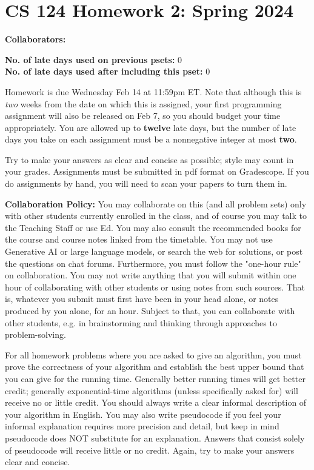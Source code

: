 \documentclass[11pt]{article}
\begin{document}


        \section*{CS 124 Homework 2: Spring 2024}


        \textbf{Collaborators: }

        \textbf{No. of late days used on previous psets:} 0\\
        \textbf{No. of late days used after including this pset:} 0

Homework is due {\color{blue} Wednesday Feb 14 at 11:59pm ET}. {\color{brown} Note that although this is \emph{two} weeks from the date on which this is assigned, your first programming assignment will also be released on Feb 7, so you should budget your time appropriately.} You are allowed up to {\bf twelve} late days, but the number of late days you take on each assignment must be a nonnegative integer at most {\bf two}. 

Try to make your answers as clear and concise as possible;
style may count in your grades. Assignments must be submitted in pdf format on Gradescope. If you do assignments by hand, you will need to scan your papers to turn them in.


{\bf Collaboration Policy:} You may collaborate on this (and all problem sets) only with other students currently enrolled in the class, and of course you may talk to the Teaching Staff or use Ed. You may also consult the recommended books for the course and course notes linked from the timetable. You may not use Generative AI or large language models, or search the web for solutions, or post the questions on chat forums. Furthermore, you must follow the "one-hour rule" on collaboration.  You may not write anything that you will submit within one hour of collaborating with other students or using notes from such sources. That is, whatever you submit must first have been in your head alone, or notes produced by you alone, for an hour. Subject to that, you can collaborate with other students, e.g. in brainstorming and thinking through approaches to problem-solving.


For all homework problems where you are asked to give an algorithm, you must prove the correctness
of your algorithm and establish the best upper bound that you can give for the running time. Generally
better running times will get better credit; generally exponential-time algorithms (unless specifically asked
for) will receive no or little credit. You should always write a clear informal description of your algorithm
in English. You may also write pseudocode if you feel your informal explanation requires more precision
and detail, but keep in mind pseudocode does NOT substitute for an explanation. Answers that consist
solely of pseudocode will receive little or no credit. Again, try to make your answers clear and concise.
\end{document}
